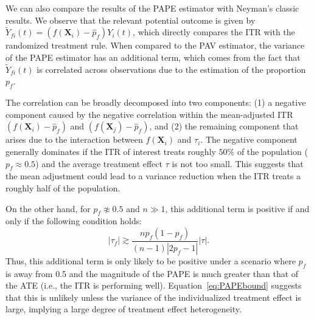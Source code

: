 \documentclass[USenglish,onecolumn]{article}
\newcommand\bX{\bm{X}}
\begin{document}
We can also compare the results of the PAPE estimator with Neyman's
classic results.  We observe that the relevant potential outcome is
given by $\widetilde{Y}_{fi}(t) = (f(\bX_i)-\hat{p}_f)Y_i(t)$, which
directly compares the ITR with the randomized treatment rule.  When
compared to the PAV estimator, the variance of the PAPE estimator has
an additional term, which comes from the fact that
$\widetilde{Y}_{fi}(t)$ is correlated across observations due to the
estimation of the proportion $p_f$.

The correlation can be broadly decomposed into two components: (1) a
negative component caused by the negative correlation within the
mean-adjusted ITR $(f(\bX_i)-\hat{p}_f)$ and $(f(\bX_j)-\hat{p}_f)$,
and (2) the remaining component that arises due to the interaction
between $f(\bX_i)$ and $\tau_i$.  The negative component generally
dominates if the ITR of interest treats roughly $50\%$ of the
population ($p_f \approx 0.5$) and the average treatment effect $\tau$
is not too small. This suggests that the mean adjustment could lead to
a variance reduction when the ITR treats a roughly half of the
population. 

On the other hand, for $p_f \not\approx 0.5$ and $n \gg 1$, this
additional term is positive if and only if the following condition
holds:
\begin{equation*}
  |\tau_f| \gtrsim
  \frac{np_f(1-p_f)}{(n-1)|2p_f-1|}|\tau|.
\end{equation*}
Thus, this additional term is only likely to be positive under a
scenario where $p_f$ is away from 0.5 and the magnitude of the PAPE is
much greater than that of the ATE (i.e., the ITR is performing
well). Equation~\eqref{eq:PAPEbound} suggests that this is unlikely
unless the variance of the individualized treatment effect is large,
implying a large degree of treatment effect heterogeneity.
\end{document}
